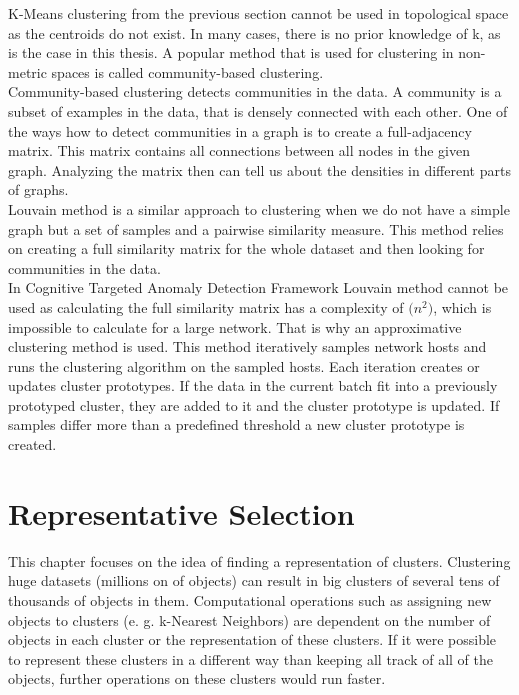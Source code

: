 \documentclass[thesis=B,english]{FITthesis}[2012/10/20]
\begin{document}
K-Means clustering from the previous section cannot be used in topological space as the centroids do not exist.
In many cases, there is no prior knowledge of k, as is the case in this thesis.
A popular method that is used for clustering in non-metric spaces is called community-based clustering. \\

Community-based clustering detects communities in the data.
A community is a subset of examples in the data, that is densely connected with each other.
One of the ways how to detect communities in a graph is to create a full-adjacency matrix.
This matrix contains all connections between all nodes in the given graph.
Analyzing the matrix then can tell us about the densities in different parts of graphs.\\

Louvain method is a similar approach to clustering when we do not have a simple graph but a set of samples and a pairwise similarity measure.
This method relies on creating a full similarity matrix for the whole dataset and then looking for communities in the data. \\

In Cognitive Targeted Anomaly Detection Framework Louvain method cannot be used as calculating the full similarity matrix has a complexity of $\mathcal(n^2)$, which is impossible to calculate for a large network.
That is why an approximative clustering method is used.
This method iteratively samples network hosts and runs the clustering algorithm on the sampled hosts.
Each iteration creates or updates cluster prototypes.
If the data in the current batch fit into a previously prototyped cluster, they are added to it and the cluster prototype is updated.
If samples differ more than a predefined threshold a new cluster prototype is created.



\chapter{Representative Selection}
This chapter focuses on the idea of finding a representation of clusters.
Clustering huge datasets (millions on of objects) can result in big clusters of several tens of thousands of objects in them.
Computational operations such as assigning new objects to clusters (e. g. k-Nearest Neighbors) are dependent on the number of objects in each cluster or the representation of these clusters.
If it were possible to represent these clusters in a different way than keeping all track of all of the objects, further operations on these clusters would run faster. \\
\end{document}
